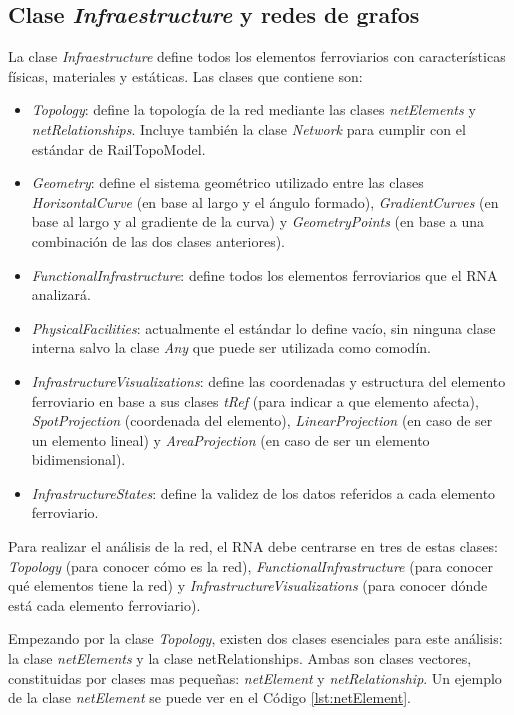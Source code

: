 \subsection{Clase \textit{Infraestructure} y redes de grafos}
    \label{sec:grafos}

    La clase \textit{Infraestructure} define todos los elementos ferroviarios con características físicas, materiales y estáticas. Las clases que contiene son:

    \begin{itemize}
        \item \textit{Topology}: define la topología de la red mediante las clases \textit{netElements} y \textit{netRelationships}. Incluye también la clase \textit{Network} para cumplir con el estándar de RailTopoModel.
        \item \textit{Geometry}: define el sistema geométrico utilizado entre las clases \textit{HorizontalCurve} (en base al largo y el ángulo formado), \textit{GradientCurves} (en base al largo y al gradiente de la curva) y \textit{GeometryPoints} (en base a una combinación de las dos clases anteriores).
        \item \textit{FunctionalInfrastructure}: define todos los elementos ferroviarios que el RNA analizará.
        \item \textit{PhysicalFacilities}: actualmente el estándar lo define vacío, sin ninguna clase interna salvo la clase \textit{Any} que puede ser utilizada como comodín.
        \item \textit{InfrastructureVisualizations}: define las coordenadas y estructura del elemento ferroviario en base a sus clases \textit{tRef} (para indicar a que elemento afecta), \textit{SpotProjection} (coordenada del elemento), \textit{LinearProjection} (en caso de ser un elemento lineal) y \textit{AreaProjection} (en caso de ser un elemento bidimensional).
        \item \textit{InfrastructureStates}: define la validez de los datos referidos a cada elemento ferroviario.
    \end{itemize}

    Para realizar el análisis de la red, el RNA debe centrarse en tres de estas clases: \textit{Topology} (para conocer cómo es la red), \textit{FunctionalInfrastructure} (para conocer qué elementos tiene la red) y \textit{InfrastructureVisualizations} (para conocer dónde está cada elemento ferroviario).

    Empezando por la clase \textit{Topology}, existen dos clases esenciales para este análisis: la clase \textit{netElements} y la clase netRelationships. Ambas son clases vectores, constituidas por clases mas pequeñas: \textit{netElement} y \textit{netRelationship}. Un ejemplo de la clase \textit{netElement} se puede ver en el Código \ref{lst:netElement}.
    
